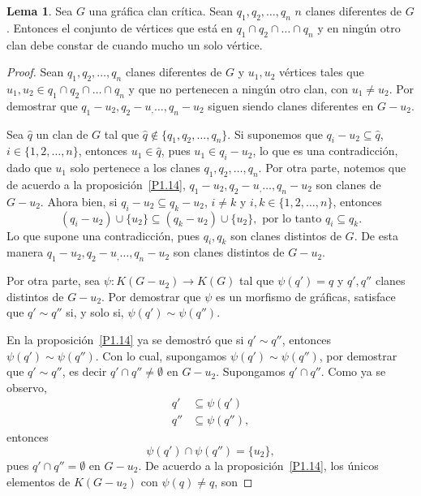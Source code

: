\documentclass[12pt]{book}
\theoremstyle{definition}
\newtheorem{Lem}[theorem]{Lema}
\begin{document}
\begin{Lem}\label{L1.16}
Sea $G$ una gráfica clan crítica. Sean $q_1,q_2,\dots,q_n$ $n$ clanes diferentes de $G$. Entonces el conjunto de vértices que está en $q_1\cap q_2\cap\dots\cap q_n$ y en ningún otro clan debe constar de cuando mucho un solo vértice.
\end{Lem}
\begin{proof}
Sean $q_1,q_2,\dots,q_n$ clanes diferentes de $G$ y $u_1,u_2$ vértices tales que $u_1,u_2\in q_1\cap q_2\cap\dots\cap q_n$ y que no pertenecen a ningún otro clan, con $u_1\neq u_2$. Por demostrar que $q_1-u_2,q_2-u_,\dots,q_n-u_2$ siguen siendo clanes diferentes en $G-u_2$.

Sea $\hat{q}$ un clan de $G$ tal que $\hat{q}\notin\{q_1,q_2,\dots,q_n\}$.
Si suponemos que $q_i-u_2\subseteq \hat{q}$, $i\in\{1,2,\dots,n\}$, entonces $u_1\in \hat{q}$, pues $u_1\in q_i-u_2$, lo que es una contradicción, dado que $u_1$ solo pertenece a los clanes $q_1,q_2,\dots,q_n$. Por otra parte, notemos que de acuerdo a la proposición~\ref{P1.14}, $q_1-u_2,q_2-u_,\dots,q_n-u_2$ son clanes de $G-u_2$. Ahora bien, si $q_i-u_2\subseteq q_{k}-u_2$, $i\neq k$ y $i,k\in\{1,2,\dots,n\}$, entonces
\begin{equation*}
(q_i-u_2)\cup\{u_2\} \subseteq (q_{k}-u_2)\cup\{u_2\},\text{ por lo tanto }q_i \subseteq q_{k}.
\end{equation*}
Lo que supone una contradicción, pues $q_i,q_{k}$ son clanes distintos de $G$. De esta manera $q_1-u_2,q_2-u_,\dots,q_n-u_2$ son clanes distintos de $G-u_2$.

Por otra parte, sea $\psi:K(G-u_2)\to K(G)$ tal que $\psi(q')=q$ y $q',q''$ clanes distintos de $G-u_2$. Por demostrar que $\psi$ es un morfismo de gráficas, satisface que $q'\sim q''$ si, y solo si, $\psi(q')\sim\psi(q'')$.

En la proposición~\ref{P1.14} ya se demostró que si $q'\sim q''$, entonces $\psi(q')\sim\psi(q'')$. Con lo cual, supongamos $\psi(q')\sim\psi(q'')$, por demostrar que $q'\sim q''$, es decir $q'\cap q''\neq\emptyset$ en $G-u_2$. Supongamos $q'\cap q''$. Como ya se observo,
\begin{equation*}
\begin{aligned}
q' &\subseteq \psi(q') \\
q'' &\subseteq \psi(q''),
\end{aligned}
\end{equation*}
entonces
\begin{equation*}
\psi(q')\cap\psi(q'')=\{u_2\},
\end{equation*}
pues $q'\cap q''=\emptyset$ en $G-u_2$. De acuerdo a la proposición~\ref{P1.14}, los únicos elementos de $K(G-u_2)$ con $\psi(q)\neq q$, son 



\end{proof}
\end{document}
